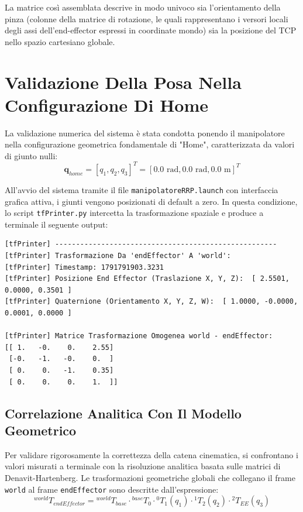 \documentclass[11pt, a4paper]{report}
\begin{document}
La matrice così assemblata descrive in modo univoco sia l'orientamento della pinza (colonne della matrice di rotazione, le quali rappresentano i versori locali degli assi dell'end-effector espressi in coordinate mondo) sia la posizione del TCP nello spazio cartesiano globale.
\newpage

\section{Validazione Della Posa Nella Configurazione Di Home}
\label{sec:validazione_posa}

La validazione numerica del sistema è stata condotta ponendo il manipolatore nella configurazione geometrica fondamentale di "Home", caratterizzata da valori di giunto nulli:
\[
    \mathbf{q}_{home} = [q_1, q_2, q_3]^T = [0.0 \text{ rad}, 0.0 \text{ rad}, 0.0 \text{ m}]^T
\]

All'avvio del sistema tramite il file \texttt{manipolatoreRRP.launch} con interfaccia grafica attiva, i giunti vengono posizionati di default a zero. In questa condizione, lo script \texttt{tfPrinter.py} intercetta la trasformazione spaziale e produce a terminale il seguente output:

\begin{verbatim}
[tfPrinter] -----------------------------------------------------
[tfPrinter] Trasformazione Da 'endEffector' A 'world':
[tfPrinter] Timestamp: 1791791903.3231
[tfPrinter] Posizione End Effector (Traslazione X, Y, Z):  [ 2.5501, 0.0000, 0.3501 ]
[tfPrinter] Quaternione (Orientamento X, Y, Z, W):  [ 1.0000, -0.0000, 0.0001, 0.0000 ]

[tfPrinter] Matrice Trasformazione Omogenea world - endEffector:
[[ 1.   -0.    0.    2.55]
 [-0.   -1.   -0.    0.  ]
 [ 0.    0.   -1.    0.35]
 [ 0.    0.    0.    1.  ]]
\end{verbatim}

\subsection{Correlazione Analitica Con Il Modello Geometrico}
\label{subsec:discussione_risultati}

Per validare rigorosamente la correttezza della catena cinematica, si confrontano i valori misurati a terminale con la risoluzione analitica basata sulle matrici di Denavit-Hartenberg. Le trasformazioni geometriche globali che collegano il frame \texttt{world} al frame \texttt{endEffector} sono descritte dall'espressione:
\[
    ^{world}T_{endEffector} = {^{world}T_{base}} \cdot {^{base}T_0} \cdot {^{0}T_1}(q_1) \cdot {^{1}T_2}(q_2) \cdot {^{2}T_{EE}}(q_3)
\]
\end{document}
